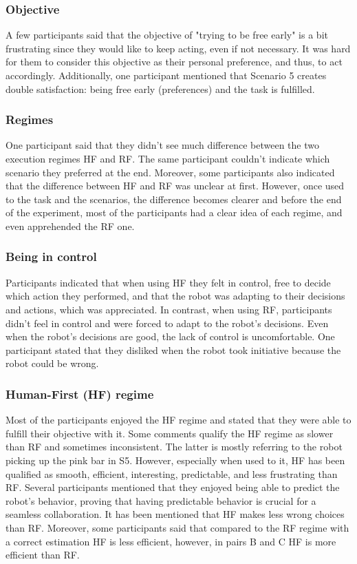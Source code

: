 \subsubsection{Objective}
A few participants said that the objective of "trying to be free early" is a bit frustrating since they would like to keep acting, even if not necessary. It was hard for them to consider this objective as their personal preference, and thus, to act accordingly. 
Additionally, one participant mentioned that Scenario 5 creates double satisfaction: being free early (preferences) and the task is fulfilled.

\subsubsection{Regimes}
One participant said that they didn't see much difference between the two execution regimes HF and RF. The same participant couldn't indicate which scenario they preferred at the end. Moreover, some participants also indicated that the difference between HF and RF was unclear at first. However, once used to the task and the scenarios, the difference becomes clearer and before the end of the experiment, most of the participants had a clear idea of each regime, and even apprehended the RF one.

\subsubsection{Being in control}
Participants indicated that when using HF they felt in control, free to decide which action they performed, and that the robot was adapting to their decisions and actions, which was appreciated. In contrast, when using RF, participants didn't feel in control and were forced to adapt to the robot's decisions. Even when the robot's decisions are good, the lack of control is uncomfortable. One participant stated that they disliked when the robot took initiative because the robot could be wrong. 

\subsubsection{Human-First (HF) regime}
Most of the participants enjoyed the HF regime and stated that they were able to fulfill their objective with it. Some comments qualify the HF regime as slower than RF and sometimes inconsistent. The latter is mostly referring to the robot picking up the pink bar in S5. However, especially when used to it, HF has been qualified as smooth, efficient, interesting, predictable, and less frustrating than RF. Several participants mentioned that they enjoyed being able to predict the robot's behavior, proving that having predictable behavior is crucial for a seamless collaboration. It has been mentioned that HF makes less wrong choices than RF.
Moreover, some participants said that compared to the RF regime with a correct estimation HF is less efficient, however, in pairs B and C HF is more efficient than RF.


